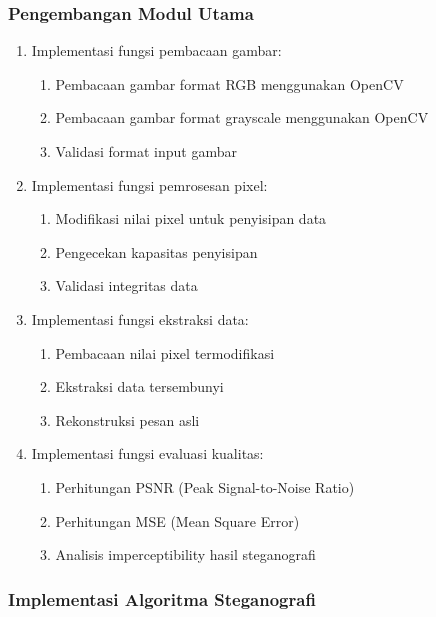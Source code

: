 \documentclass{ittelkom}
\begin{document}
\subsubsection{Pengembangan Modul Utama}

\begin{enumerate}
    \item Implementasi fungsi pembacaan gambar:
          \begin{enumerate}
              \item Pembacaan gambar format RGB menggunakan OpenCV
              \item Pembacaan gambar format grayscale menggunakan OpenCV
              \item Validasi format input gambar
          \end{enumerate}

    \item Implementasi fungsi pemrosesan pixel:
          \begin{enumerate}
              \item Modifikasi nilai pixel untuk penyisipan data
              \item Pengecekan kapasitas penyisipan
              \item Validasi integritas data
          \end{enumerate}

    \item Implementasi fungsi ekstraksi data:
          \begin{enumerate}
              \item Pembacaan nilai pixel termodifikasi
              \item Ekstraksi data tersembunyi
              \item Rekonstruksi pesan asli
          \end{enumerate}

    \item Implementasi fungsi evaluasi kualitas:
          \begin{enumerate}
              \item Perhitungan PSNR (Peak Signal-to-Noise Ratio)
              \item Perhitungan MSE (Mean Square Error)
              \item Analisis imperceptibility hasil steganografi
          \end{enumerate}
\end{enumerate}

\subsubsection{Implementasi Algoritma Steganografi}
\end{document}
